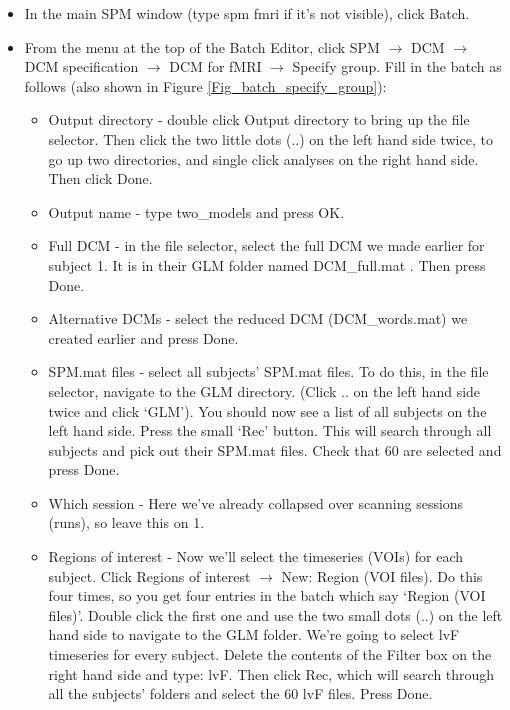 \documentclass{article}
\begin{document}
\begin{itemize}

\item In the main SPM window (type spm fmri if it's not visible), click Batch.

\item From the menu at the top of the Batch Editor, click SPM $\rightarrow$ DCM $\rightarrow$ DCM specification $\rightarrow$ DCM for fMRI $\rightarrow$ Specify group. Fill in the batch as follows (also shown in Figure \ref{Fig_batch_specify_group}):

\begin{itemize}
    

\item Output directory - double click Output directory to bring up the file selector. Then click the two little dots (..) on the left hand side twice, to go up two directories, and single click analyses on the right hand side. Then click Done.

\item Output name - type two\_models and press OK.

\item Full DCM - in the file selector, select the full DCM we made earlier for subject 1. It is in their GLM folder named DCM\_full.mat . Then press Done.

\item Alternative DCMs - select the reduced DCM (DCM\_words.mat) we created earlier and press Done.

\item SPM.mat files - select all subjects' SPM.mat files. To do this, in the file selector, navigate to the GLM directory. (Click .. on the left hand side twice and click `GLM'). You should now see a list of all subjects on the left hand side. Press the small `Rec' button. This will search through all subjects and pick out their SPM.mat files. Check that 60 are selected and press Done.

\item Which session - Here we've already collapsed over scanning sessions (runs), so leave this on 1.

\item Regions of interest - Now we'll select the timeseries (VOIs) for each subject. Click Regions of interest $\rightarrow$ New: Region (VOI files). Do this four times, so you get four entries in the batch which say `Region (VOI files)'. Double click the first one and use the two small dots (..) on the left hand side to navigate to the GLM folder. We're going to select lvF timeseries for every subject. Delete the contents of the Filter box on the right hand side and type: lvF. Then click Rec, which will search through all the subjects' folders and select the 60 lvF files. Press Done.


\end{itemize}
\end{itemize}
\end{document}
